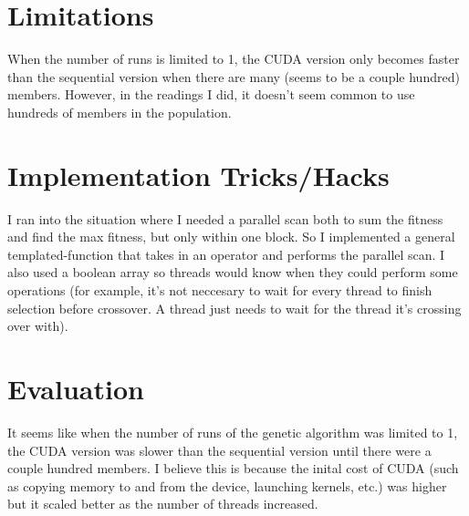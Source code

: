 \documentclass[9pt]{article}
\begin{document}
\section{Limitations}
When the number of runs is limited to 1, the CUDA version only becomes faster than the sequential version when there are many (seems to be a couple hundred) members. However, in the readings I did, it doesn't seem common to use hundreds of members in the population.

\section{Implementation Tricks/Hacks}
I ran into the situation where I needed a parallel scan both to sum the fitness and find the max fitness, but only within one block. So I implemented a general templated-function that takes in an operator and performs the parallel scan. I also used a boolean array so threads would know when they could perform some operations (for example, it's not neccesary to wait for every thread to finish selection before crossover. A thread just needs to wait for the thread it's crossing over with).

\section{Evaluation}
It seems like when the number of runs of the genetic algorithm was limited to 1, the CUDA version was slower than the sequential version until there were a couple hundred members. I believe this is because the inital cost of CUDA (such as copying memory to and from the device, launching kernels, etc.) was higher but it scaled better as the number of threads increased.\\
\end{document}
